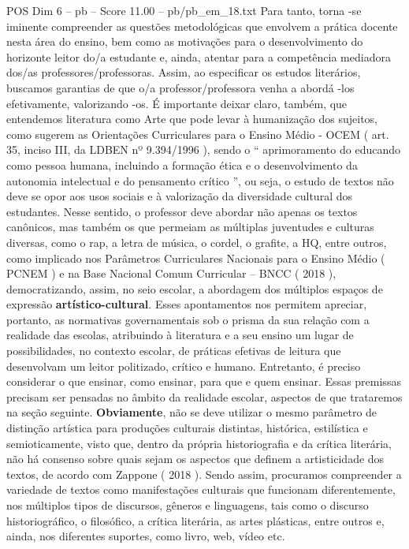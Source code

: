 \begin{textsample}{POS Dim 6 – pb – Score 11.00 – pb/pb\_em\_18.txt}
Para tanto, torna -se iminente compreender as questões metodológicas que envolvem a prática docente nesta área do ensino, bem como as motivações para o desenvolvimento do horizonte leitor do/a estudante e, ainda, atentar para a competência mediadora dos/as professores/professoras.
Assim, ao especificar os estudos literários, buscamos garantias de que o/a professor/professora venha a abordá -los efetivamente, valorizando -os.
É importante deixar claro, também, que entendemos literatura como Arte que pode levar à humanização dos sujeitos, como sugerem as Orientações Curriculares para o Ensino Médio - OCEM ( art. 35, inciso III, da LDBEN nº 9.394/1996 ), sendo o “ aprimoramento do educando como pessoa humana, incluindo a formação ética e o desenvolvimento da autonomia intelectual e do pensamento crítico ”, ou seja, o estudo de textos não deve se opor aos usos sociais e à valorização da diversidade cultural dos estudantes.
Nesse sentido, o professor deve abordar não apenas os textos canônicos, mas também os que permeiam as múltiplas juventudes e culturas diversas, como o rap, a letra de música, o cordel, o grafite, a HQ, entre outros, como implicado nos Parâmetros Curriculares Nacionais para o Ensino Médio ( PCNEM ) e na Base Nacional Comum Curricular – BNCC ( 2018 ), democratizando, assim, no seio escolar, a abordagem dos múltiplos espaços de expressão \textbf{artístico-cultural}.
Esses apontamentos nos permitem apreciar, portanto, as normativas governamentais sob o prisma da sua relação com a realidade das escolas, atribuindo à literatura e a seu ensino um lugar de possibilidades, no contexto escolar, de práticas efetivas de leitura que desenvolvam um leitor politizado, crítico e humano.
Entretanto, é preciso considerar o que ensinar, como ensinar, para que e quem ensinar.
Essas premissas precisam ser pensadas no âmbito da realidade escolar, aspectos de que trataremos na seção seguinte. \textbf{Obviamente}, não se deve utilizar o mesmo parâmetro de distinção artística para produções culturais distintas, histórica, estilística e semioticamente, visto que, dentro da própria historiografia e da crítica literária, não há consenso sobre quais sejam os aspectos que definem a artisticidade dos textos, de acordo com Zappone ( 2018 ).
Sendo assim, procuramos compreender a variedade de textos como manifestações culturais que funcionam diferentemente, nos múltiplos tipos de discursos, gêneros e linguagens, tais como o discurso historiográfico, o filosófico, a crítica literária, as artes plásticas, entre outros e, ainda, nos diferentes suportes, como livro, web, vídeo etc.

\end{textsample}
